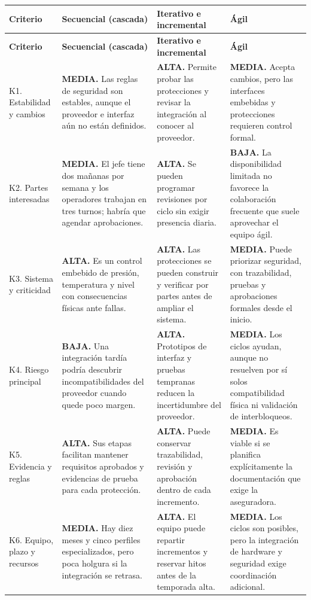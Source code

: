 \documentclass[10pt,letterpaper]{article}
\begin{document}
\scriptsize
\par
\begin{longtable}{@{}p{3.15cm}p{7.15cm}p{7.15cm}p{7.15cm}@{}}
\rowcolor{verde}\color{white}\textbf{Criterio}&\color{white}\textbf{Secuencial (cascada)}&\color{white}\textbf{Iterativo e incremental}&\color{white}\textbf{Ágil}\\\endfirsthead
\rowcolor{verde}\color{white}\textbf{Criterio}&\color{white}\textbf{Secuencial (cascada)}&\color{white}\textbf{Iterativo e incremental}&\color{white}\textbf{Ágil}\\\endhead
K1. Estabilidad y cambios&\textbf{MEDIA.} Las reglas de seguridad son estables, aunque el proveedor e interfaz aún no están definidos.&\textbf{ALTA.} Permite probar las protecciones y revisar la integración al conocer al proveedor.&\textbf{MEDIA.} Acepta cambios, pero las interfaces embebidas y protecciones requieren control formal.\\\hline
K2. Partes interesadas&\textbf{MEDIA.} El jefe tiene dos mañanas por semana y los operadores trabajan en tres turnos; habría que agendar aprobaciones.&\textbf{ALTA.} Se pueden programar revisiones por ciclo sin exigir presencia diaria.&\textbf{BAJA.} La disponibilidad limitada no favorece la colaboración frecuente que suele aprovechar el equipo ágil.\\\hline
K3. Sistema y criticidad&\textbf{ALTA.} Es un control embebido de presión, temperatura y nivel con consecuencias físicas ante fallas.&\textbf{ALTA.} Las protecciones se pueden construir y verificar por partes antes de ampliar el sistema.&\textbf{MEDIA.} Puede priorizar seguridad, con trazabilidad, pruebas y aprobaciones formales desde el inicio.\\\hline
K4. Riesgo principal&\textbf{BAJA.} Una integración tardía podría descubrir incompatibilidades del proveedor cuando quede poco margen.&\textbf{ALTA.} Prototipos de interfaz y pruebas tempranas reducen la incertidumbre del proveedor.&\textbf{MEDIA.} Los ciclos ayudan, aunque no resuelven por sí solos compatibilidad física ni validación de interbloqueos.\\\hline
K5. Evidencia y reglas&\textbf{ALTA.} Sus etapas facilitan mantener requisitos aprobados y evidencias de prueba para cada protección.&\textbf{ALTA.} Puede conservar trazabilidad, revisión y aprobación dentro de cada incremento.&\textbf{MEDIA.} Es viable si se planifica explícitamente la documentación que exige la aseguradora.\\\hline
K6. Equipo, plazo y recursos&\textbf{MEDIA.} Hay diez meses y cinco perfiles especializados, pero poca holgura si la integración se retrasa.&\textbf{ALTA.} El equipo puede repartir incrementos y reservar hitos antes de la temporada alta.&\textbf{MEDIA.} Los ciclos son posibles, pero la integración de hardware y seguridad exige coordinación adicional.\\
\end{longtable}
\end{document}
